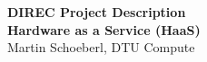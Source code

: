 \documentclass[fleqn,12pt]{article}
\begin{document}
\setlength{\baselineskip}{1.44\baselineskip}


\begin{center}
  {\LARGE\bf DIREC Project Description }\\[1ex]
  {\LARGE\bf Hardware as a Service (HaaS)}\\[1ex]
  {\large Martin Schoeberl, DTU Compute}\\[1ex]
 \end{center}


%

\end{document}

